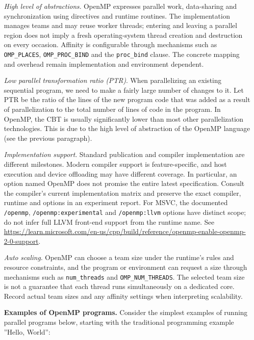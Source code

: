 {	\par\textit{High level of abstractions.} OpenMP expresses parallel work, data-sharing and synchronization using directives and runtime routines. The implementation manages teams and may reuse worker threads; entering and leaving a parallel region does not imply a fresh operating-system thread creation and destruction on every occasion. Affinity is configurable through mechanisms such as \texttt{OMP\_PLACES}, \texttt{OMP\_PROC\_BIND} and the \texttt{proc\_bind} clause. The concrete mapping and overhead remain implementation and environment dependent.
	\par\textit{Low parallel transformation ratio (PTR)}. When parallelizing an existing sequential program, we need to make a fairly large number of changes to it. Let PTR be the ratio of the lines of the new program code that was added as a result of parallelization to the total number of lines of code in the program. In OpenMP, the CBT is usually significantly lower than most other parallelization technologies. This is due to the high level of abstraction of the OpenMP language (see the previous paragraph).
	\par\textit{Implementation support.} Standard publication and compiler implementation are different milestones. Modern compiler support is feature-specific, and host execution and device offloading may have different coverage. In particular, an option named OpenMP does not promise the entire latest specification. Consult the compiler's current implementation matrix and preserve the exact compiler, runtime and options in an experiment report. For MSVC, the documented \texttt{/openmp}, \texttt{/openmp:experimental} and \texttt{/openmp:llvm} options have distinct scope; do not infer full LLVM front-end support from the runtime name. See \url{https://learn.microsoft.com/en-us/cpp/build/reference/openmp-enable-openmp-2-0-support}.
	\par\textit{Auto scaling.}  
	OpenMP can choose a team size under the runtime's rules and resource constraints, and the program or environment can request a size through mechanisms such as \texttt{num\_threads} and \texttt{OMP\_NUM\_THREADS}. The selected team size is not a guarantee that each thread runs simultaneously on a dedicated core. Record actual team sizes and any affinity settings when interpreting scalability.
	\par\textbf{Examples of OpenMP programs.} Consider the simplest examples of running parallel programs below, starting with the traditional programming example ''Hello, World'':
}
